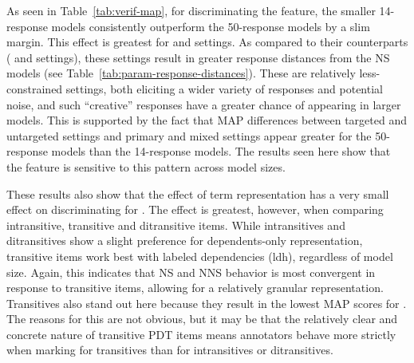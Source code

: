 As seen in Table~\ref{tab:verif-map}, for discriminating the  feature, the smaller 14-response models consistently outperform the 50-response models by a slim margin. This effect is greatest for  and  settings. As compared to their counterparts ( and  settings), these settings result in greater response distances from the NS models (see Table~\ref{tab:param-response-distances}). These are relatively less-constrained settings, both eliciting a wider variety of responses and potential noise, and such ``creative'' responses have a greater chance of appearing in larger models. This is supported by the fact that MAP differences between targeted and untargeted settings and primary and mixed settings appear greater for the 50-response models than the 14-response models. The results seen here show that the  feature is sensitive to this pattern across model sizes. 

These results also show that the effect of term representation has a very small effect on discriminating for . The effect is greatest, however, when comparing intransitive, transitive and ditransitive items. While intransitives and ditransitives show a slight preference for dependents-only representation, transitive items 
work best with labeled dependencies (ldh), regardless of model size. Again, this indicates that NS and NNS behavior is most convergent in response to transitive items, allowing for a relatively granular representation. Transitives also stand out here because they result in the lowest MAP scores for .  The reasons for this are not obvious, but it may be that the relatively clear and concrete nature of transitive PDT items means annotators behave more strictly when marking  for transitives than for intransitives or ditransitives.


